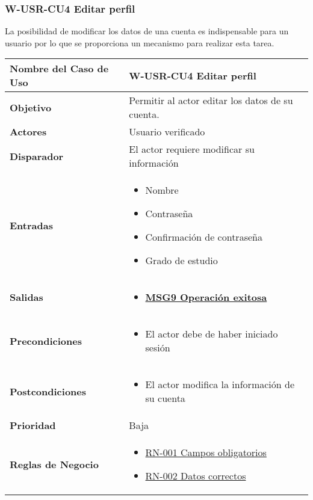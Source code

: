 \subsubsection{W-USR-CU4 Editar perfil}
La posibilidad de modificar los datos de una cuenta es indispensable para un usuario por lo que se proporciona un mecanismo para realizar esta tarea.
\begin{longtable}{|J{5cm}|J{10.3cm}|}
	\hline
	\textbf{Nombre del Caso de Uso} &
		W-USR-CU4 Editar perfil \\ \hline
	\textbf{Objetivo} &
		Permitir al actor editar los datos de su cuenta. \\ \hline
	\textbf{Actores} &
		Usuario verificado \\ \hline 
	\textbf{Disparador} & 
		El actor requiere modificar su información \\ \hline 
	\textbf{Entradas} & 
		\begin{itemize}
		    \item Nombre
		    \item Contraseña
		    \item Confirmación de contraseña
		    \item Grado de estudio
		\end{itemize} \\ \hline 
	\textbf{Salidas} & 
		\begin{itemize}
		    \item \hyperref[MSG9]{\bf MSG9 Operación exitosa}
		\end{itemize} \\ \hline
	\textbf{Precondiciones} &
		\begin{itemize}
				\item El actor debe de haber iniciado sesión
		\end{itemize} \\ \hline
	\textbf{Postcondiciones} &
		\begin{itemize}
			\item El actor modifica la información de su cuenta
		\end{itemize}\\ \hline
	\textbf{Prioridad} & 
		Baja \\ \hline
	\textbf{Reglas de Negocio} & 
		\begin{itemize}
		    \item \hyperref[RN001]{RN-001 Campos obligatorios}
		    \item \hyperref[RN002]{RN-002 Datos correctos}
		\end{itemize} \\ \hline

\end{longtable}
